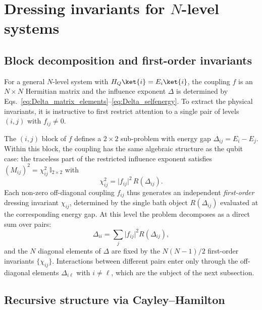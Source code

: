 \section{Dressing invariants for \texorpdfstring{$N$}{N}-level systems\label{sec:general_N}}

\subsection{Block decomposition and first-order invariants\label{subsec:block_decomp}}

For a general $N$-level system with $H_Q\ket{i}=E_i\ket{i}$, the coupling $f$ is an $N\times N$
Hermitian matrix and the influence exponent $\Delta$ is determined by
Eqs.~\eqref{eq:Delta_matrix_elements}--\eqref{eq:Delta_selfenergy}. To extract the physical
invariants, it is instructive to first restrict attention to a single pair of levels
$(i,j)$ with $f_{ij}\neq 0$.

The $(i,j)$ block of $f$ defines a $2\times 2$ sub-problem with energy gap $\Delta_{ij}=E_i-E_j$.
Within this block, the coupling has the same algebraic structure as the qubit case: the traceless
part of the restricted influence exponent satisfies $(M_{ij})^2=\chi_{ij}^2\,\mathbb{I}_{2\times 2}$
with
\begin{equation}
    \chi_{ij}^2 = \lvert f_{ij}\rvert^2\,R(\Delta_{ij}).
    \label{eq:chi_ij_first_order}
\end{equation}
Each non-zero off-diagonal coupling $f_{ij}$ thus generates an independent \emph{first-order}
dressing invariant $\chi_{ij}$, determined by the single bath object $R(\Delta_{ij})$ evaluated
at the corresponding energy gap. At this level the problem decomposes as a direct sum over pairs:
\begin{equation}
    \Delta_{ii}=\sum_j\lvert f_{ij}\rvert^2 R(\Delta_{ij}),
    \label{eq:Delta_diag_sum}
\end{equation}
and the $N$ diagonal elements of $\Delta$ are fixed by the $N(N-1)/2$ first-order invariants
$\{\chi_{ij}\}$. Interactions between different pairs enter only through the off-diagonal
elements $\Delta_{i\ell}$ with $i\neq\ell$, which are the subject of the next subsection.

\subsection{Recursive structure via Cayley--Hamilton\label{subsec:cayley_hamilton}}

